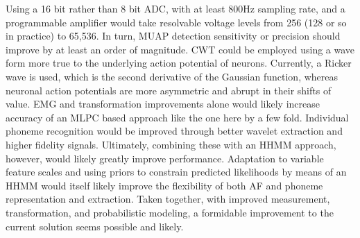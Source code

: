 \documentclass[conference]{IEEEtran}
\begin{document}
Using a 16 bit rather than 8 bit ADC, with at least 800Hz sampling rate, and a programmable amplifier would take resolvable voltage levels from 256 (128 or so in practice) to 65,536. In turn, MUAP detection sensitivity or precision should improve by at least an order of magnitude. CWT could be employed using a wave form more true to the underlying action potential of neurons. Currently, a Ricker wave is used, which is the second derivative of the Gaussian function, whereas neuronal action potentials are more asymmetric and abrupt in their shifts of value. EMG and transformation improvements alone would likely increase accuracy of an MLPC based approach like the one here by a few fold. Individual phoneme recognition would be improved through better wavelet extraction and higher fidelity signals. Ultimately, combining these with an HHMM approach, however, would likely greatly improve performance. Adaptation to variable feature scales and using priors to constrain predicted likelihoods by means of an HHMM would itself likely improve the flexibility of both AF and phoneme representation and extraction. Taken together, with improved measurement, transformation, and probabilistic modeling, a formidable improvement to the current solution seems possible and likely.



%

%
\end{document}
